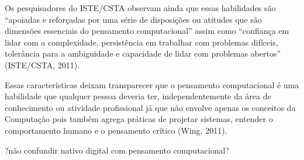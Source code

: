 \documentclass[12pt, openright, a4paper, brazil, openany, oneside]{abntex2}
\begin{document}
Os pesquisadores do ISTE/CSTA observam ainda que essas habilidades são ``apoiadas e reforçadas por uma série de disposições ou atitudes que são dimensões essenciais do pensamento computacional'' assim como ``confiança em lidar com a complexidade, persistência em trabalhar com problemas difíceis, tolerância para a ambiguidade e capacidade de lidar com problemas abertos''\cite{iste/csta} (ISTE/CSTA, 2011).

Essas características deixam transparecer que o pensamento computacional é uma habilidade que qualquer pessoa deveria ter, independentemente da área de conhecimento ou atividade profissional já que não envolve apenas os conceitos da Computação pois também agrega práticas de projetar sistemas, entender o comportamento humano e o pensamento crítico \cite{wing} (Wing, 2011).

?não confundir nativo digital com pensamento computacional? 
\end{document}
